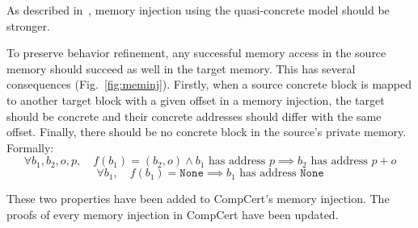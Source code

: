 As described in~\cite{DBLP:conf/pldi/KangHMGZV15}, memory injection using the quasi-concrete model should be stronger.

To preserve behavior refinement, any successful memory access in the source memory should succeed as well in the target memory. This has several consequences (Fig.~\ref{fig:meminj}).
Firstly, when a source concrete block is mapped to another target block with a given offset in a memory injection, the target should be concrete and their concrete addresses should differ with the same offset.
Finally, there should be no concrete block in the source's private memory.
Formally:
$$\forall b_1,b_2,o,p,\quad f(b_1)=(b_2,o)\wedge b_1\text{ has address }p\implies b_2\text{ has address }p+o$$
$$\forall b_1,\quad f(b_1)=\texttt{None}\implies b_1\text{ has address }\texttt{None}$$

These two properties have been added to CompCert's memory injection. The proofs of every memory injection in CompCert have been updated.


